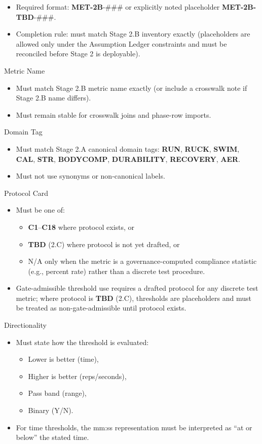 \documentclass[10pt]{article}
\begin{document}
\begin{itemize}
\item Required format: \textbf{MET-2B}-\#\#\# or explicitly noted placeholder \textbf{MET-2B-TBD}-\#\#\#.
\item Completion rule: must match Stage 2.B inventory exactly (placeholders are allowed only under the Assumption Ledger constraints and must be reconciled before Stage 2 is deployable).
\end{itemize}

Metric Name

\begin{itemize}
\item Must match Stage 2.B metric name exactly (or include a crosswalk note if Stage 2.B name differs).
\item Must remain stable for crosswalk joins and phase-row imports.
\end{itemize}

Domain Tag

\begin{itemize}
\item Must match Stage 2.A canonical domain tags: \textbf{RUN}, \textbf{RUCK}, \textbf{SWIM}, \textbf{CAL}, \textbf{STR}, \textbf{BODYCOMP}, \textbf{DURABILITY}, \textbf{RECOVERY}, \textbf{AER}.
\item Must not use synonyms or non-canonical labels.
\end{itemize}

Protocol Card

\begin{itemize}
\item Must be one of:
  \begin{itemize}
  \item \textbf{C1}–\textbf{C18} where protocol exists, or
  \item \textbf{TBD} (2.C) where protocol is not yet drafted, or
  \item N/A only when the metric is a governance-computed compliance statistic (e.g., percent rate) rather than a discrete test procedure.
  \end{itemize}
\item Gate-admissible threshold use requires a drafted protocol for any discrete test metric; where protocol is \textbf{TBD} (2.C), thresholds are placeholders and must be treated as non-gate-admissible until protocol exists.
\end{itemize}

Directionality

\begin{itemize}
\item Must state how the threshold is evaluated:
  \begin{itemize}
  \item Lower is better (time),
  \item Higher is better (reps/seconds),
  \item Pass band (range),
  \item Binary (Y/N).
  \end{itemize}
\item For time thresholds, the mm:ss representation must be interpreted as “at or below” the stated time.
\end{itemize}
\end{document}
